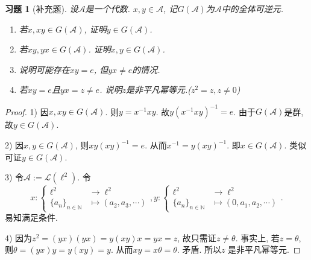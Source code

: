 \documentclass[UTF8,twoside]{ctexbook}
\newtheorem{exercise}{习题}[section]
\newcommand{\h}{\mathscr}
\newcommand{\kx}{\mathbb}
\numberwithin{equation}{section}
\begin{document}
	\begin{exercise}[补充题]
		设$\h A$是一个代数. $x,y\in\h A$, 记$G(\h A)$为$\h A$中的全体可逆元.
		\begin{enumerate}[1)]
			\item 若$x,xy\in G(\h A)$, 证明$y\in G(\h A)$.
			\item 若$xy,yx\in G(\h A)$. 证明$x,y\in G(\h A)$.
			\item 说明可能存在$xy=e$, 但$yx\neq e$的情况.
			\item 若$xy=e$且$yx=z\neq e$. 说明$z$是非平凡幂等元.($z^2=z,z\neq 0$)
		\end{enumerate}
	\end{exercise}
	\begin{proof}
		1) 因$x,xy\in G(\h A)$. 则$y=x^{-1}xy$. 故$y(x^{-1}xy)^{-1}=e$. 由于$G(\h A)$是群, 故$y\in G(\h A)$.

		2) 因$x,y\in G(\h A)$, 则$xy(xy)^{-1}=e$. 从而$x^{-1}=y(xy)^{-1}$. 即$x\in G(\h A)$. 类似可证$y\in G(\h A)$.

		3) 令$\h A:=\h L(\ell^2)$. 令
		\[
		x:\left\{
		\begin{aligned}
		\ell^2&\rightarrow\ell^2\\
		\{a_n\}_{n\in\kx N}&\mapsto (a_2,a_3,\cdots)
		\end{aligned}
		\right.,
		y:\left\{
		\begin{aligned}
		\ell^2&\rightarrow\ell^2\\
		\{a_n\}_{n\in\kx N}&\mapsto (0,a_1,a_2,\cdots)
		\end{aligned}
		\right..
		\]
		易知满足条件.

		4) 因为$z^2=(yx)(yx)=y(xy)x=yx=z$, 故只需证$z\neq\theta$. 事实上, 若$z=\theta$, 则$\theta=(yx)y=y(xy)=y$. 从而$xy=x\theta=\theta$. 矛盾. 所以$z$ 是非平凡幂等元.
	\end{proof}
\end{document}
